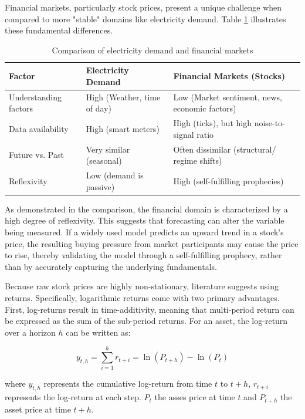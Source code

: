 \documentclass[12pt,twoside=false,a4paper,parskip]{scrbook}
\begin{document}
Financial markets, particularly stock prices, present a unique challenge when compared to more "stable" domains like electricity demand. Table \ref{tab:domain_comparison} illustrates these fundamental differences.
\begin{table}[htbp]
    \centering
    \begin{tabular}{p{3cm} | p{5cm} | p{5cm}}
        \hline
        \textbf{Factor} & \textbf{Electricity Demand} & \textbf{Financial Markets (Stocks)} \\ \hline
        Understanding factors & High (Weather, time of day) & Low (Market sentiment, news, economic factors) \\ \hline
        Data availability & High (smart meters) & High (ticks), but high noise-to-signal ratio \\ \hline
        Future vs. Past & Very similar (seasonal) & Often dissimilar (structural/ regime shifts) \\ \hline
        Reflexivity & Low (demand is passive) & High (self-fulfilling prophecies) \\ \hline
    \end{tabular}
    \caption{Comparison of electricity demand and financial markets}
    \label{tab:domain_comparison}
\end{table}
As demonstrated in the comparison, the financial domain is characterized by a high degree of reflexivity. This suggests that forecasting can alter the variable being measured. If a widely used model predicts an upward trend in a stock's price, the resulting buying pressure from market participants may cause the price to rise, thereby validating the model through a self-fulfilling prophecy, rather than by accurately capturing the underlying fundamentals.

Because raw stock prices are highly non-stationary, literature suggests using returns. Specifically, logarithmic returns come with two primary advantages. 
First, log-returns result in time-additivity, meaning that multi-period return can be expressed as the sum of the sub-period returns. For an asset, the log-return over a horizon $h$ can be written as:

\begin{equation}
y_{t,h} = \sum_{i=1}^{h} r_{t+i} = \ln(P_{t+h}) - \ln(P_t)
\label{eq:log_return_additivity}
\end{equation}


where $y_{t,h}$ represents the cumulative log-return from time $t$ to $t+h$, $r_{t+i}$ represents the log-return at each step. $P_t$ the asses price at time $t$ and $P_{t+h}$ the asset price at time $t+h$.
\end{document}
